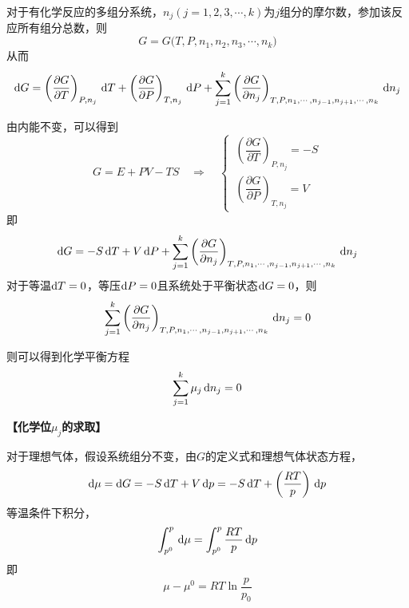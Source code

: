 对于有化学反应的多组分系统，$n_j (j = 1,2,3,\cdots,k)$为$j$组分的摩尔数，参加该反应所有组分总数，则
\begin{equation}
	G = G\big(T, P, n_1, n_2,n_3, \cdots ,n_k\big)
\end{equation}
从而
\begin{equation}
	{\rm{d}} G = \left(\dfrac{\partial G}{\partial T}\right)_{P, n_j} \, {\rm{d}} T + \left(\dfrac{\partial G}{\partial P}\right)_{T, n_j}\, {\rm{d}} P + \sum_{j = 1}^{k} \left(\dfrac{\partial G}{\partial n_j}\right)_{T, P, n_1, \cdots , n_{j - 1}, n_{j + 1}, \cdots, n_k}\, {\rm{d}} n_j
\end{equation}

由内能不变，可以得到
\begin{equation}
	G = E + PV - TS \quad \Rightarrow \quad 
	\begin{cases}
		\, \left(\dfrac{\partial G}{\partial T}\right)_{P,n_j} = - S \\[0.7em]
		\, \left(\dfrac{\partial G}{\partial P}\right)_{T, n_j} = V
	\end{cases}
\end{equation}
即
\begin{equation}
	{\rm{d}} G = - S\, {\rm{d}} T + V\, {\rm{d}} P + \sum_{j = 1}^{k} \left(\dfrac{\partial G}{\partial n_j}\right)_{T,P,n_1, \cdots, n_{j-1}, n_{j+1}, \cdots, n_k} \, {\rm{d}} n_j
\end{equation}
对于等温${\rm{d}} T = 0$，等压${\rm{d}} P = 0$且系统处于平衡状态${\rm{d}} G = 0$，则
\begin{equation}
	 \sum_{j = 1}^{k} \left(\dfrac{\partial G}{\partial n_j}\right)_{T, P, n_1, \cdots , n_{j - 1}, n_{j + 1}, \cdots, n_k}\, {\rm{d}} n_j = 0
\end{equation}
\vspace*{-1em}


则可以得到化学平衡方程
\begin{equation}
	\sum_{j = 1}^{k} \mu_j \, {\rm{d}} n_j = 0
\end{equation}


\noindent\textbf{【化学位$\mu_j$的求取】}

对于理想气体，假设系统组分不变，由$G$的定义式和理想气体状态方程，
\begin{equation}
	{\rm{d}} \mu = {\rm{d}} G = - S \, {\rm{d}} T + V\, {\rm{d}} p = - S\,  {\rm{d}} T + \left(\dfrac{RT}{p}\right)\, {\rm{d}} p
\end{equation}
等温条件下积分，
\begin{equation}
	\int_{p^0}^{p} \, {\rm{d}} \mu = \int_{p^0}^{p} \dfrac{RT}{p} \, {\rm{d}} p
\end{equation}
即
\begin{equation}
	\mu - \mu^0 = RT\ln \dfrac{p}{p_0}
\end{equation}

